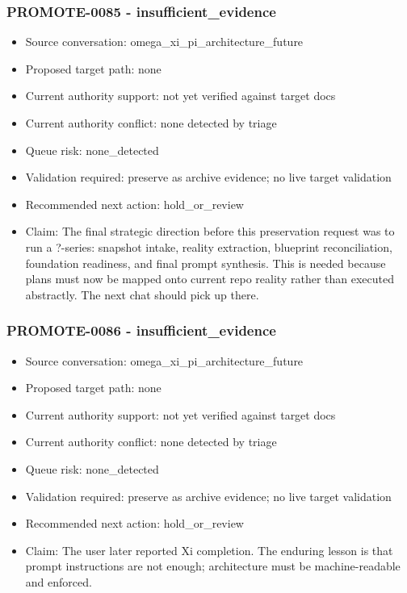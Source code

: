 \documentclass[11pt,a4paper]{report}
\begin{document}
\subsubsection{PROMOTE-0085 - insufficient\_evidence}

\begin{itemize}
\item Source conversation: omega\_xi\_pi\_architecture\_future
\item Proposed target path: none
\item Current authority support: not yet verified against target docs
\item Current authority conflict: none detected by triage
\item Queue risk: none\_detected
\item Validation required: preserve as archive evidence; no live target validation
\item Recommended next action: hold\_or\_review
\item Claim: The final strategic direction before this preservation request was to run a ?-series: snapshot intake, reality extraction, blueprint reconciliation, foundation readiness, and final prompt synthesis. This is needed because plans must now be mapped onto current repo reality rather than executed abstractly. The next chat should pick up there.
\end{itemize}

\subsubsection{PROMOTE-0086 - insufficient\_evidence}

\begin{itemize}
\item Source conversation: omega\_xi\_pi\_architecture\_future
\item Proposed target path: none
\item Current authority support: not yet verified against target docs
\item Current authority conflict: none detected by triage
\item Queue risk: none\_detected
\item Validation required: preserve as archive evidence; no live target validation
\item Recommended next action: hold\_or\_review
\item Claim: The user later reported Xi completion. The enduring lesson is that prompt instructions are not enough; architecture must be machine-readable and enforced.
\end{itemize}
\end{document}
